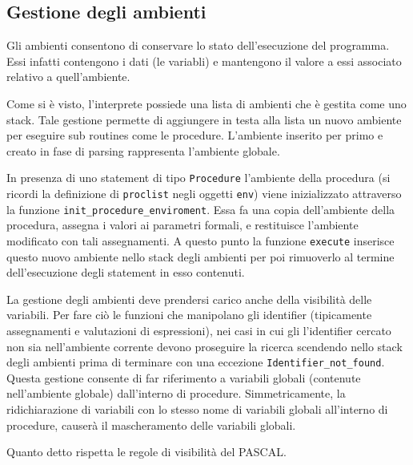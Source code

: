 \documentclass[a4paper,10pt]{article}
\begin{document}
\subsection{Gestione degli ambienti}
Gli ambienti consentono di conservare lo stato dell'esecuzione del programma.
Essi infatti contengono i dati (le variabli) e mantengono il valore a essi
associato relativo a quell'ambiente.

Come si \`e visto, l'interprete possiede una lista di ambienti che \`e
gestita come uno stack. Tale gestione permette di aggiungere in testa alla lista
un nuovo ambiente per eseguire sub routines come le procedure. L'ambiente
inserito per primo e creato in fase di parsing rappresenta l'ambiente globale.

In presenza di uno statement di tipo \texttt{Procedure} l'ambiente della 
procedura (si ricordi la definizione di \texttt{proclist} negli oggetti 
\texttt{env}) viene inizializzato attraverso la funzione 
\texttt{init\_procedure\_enviroment}.
Essa fa una copia dell'ambiente della procedura, assegna i valori ai parametri 
formali, e restituisce l'ambiente modificato con tali assegnamenti.
A questo punto la funzione \texttt{execute} inserisce questo nuovo ambiente 
nello stack degli ambienti per poi rimuoverlo al termine dell'esecuzione degli
 statement in esso contenuti.

La gestione degli ambienti deve prendersi carico anche della visibilit\`a delle
 variabili. Per fare ci\`o le funzioni che manipolano gli
 identifier (tipicamente assegnamenti e valutazioni di espressioni), nei casi in
cui gli l'identifier cercato non sia nell'ambiente corrente devono proseguire la
ricerca scendendo nello stack degli ambienti prima di terminare con una
eccezione \texttt{Identifier\_not\_found}.
 Questa gestione consente di far riferimento a variabili globali (contenute
nell'ambiente globale) dall'interno di procedure. Simmetricamente, la
ridichiarazione di variabili con lo stesso nome di variabili globali all'interno
di procedure, causer\`a il mascheramento delle variabili globali.

Quanto detto rispetta le regole di visibilit\`a del PASCAL.
\end{document}
